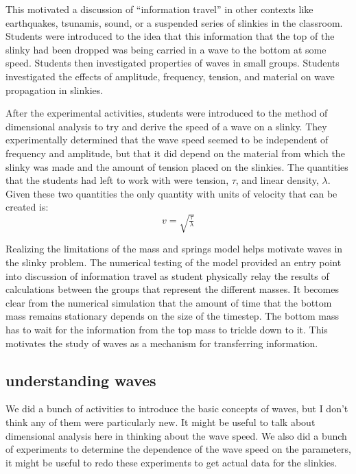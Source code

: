 \documentclass[aps,pre,10pt,superscriptaddress,showpacs,amsmath,amssymb,nofootinbib]{revtex4-1}
\begin{document}
This motivated a discussion of ``information travel'' in other contexts like earthquakes, tsunamis, 
sound, or a suspended series of slinkies in the classroom. Students were introduced to the idea that
this information that the top of the slinky had been dropped was being carried in a wave to the bottom
at some speed. Students then investigated properties of waves in small groups. Students investigated the
effects of amplitude, frequency, tension, and material on wave propagation in slinkies.

After the experimental activities, students were introduced to the method of dimensional analysis
to try and derive the speed of a wave on a slinky. They experimentally determined that the wave speed
seemed to be independent of frequency and amplitude, but that it did depend on the material from which
the slinky was made and the amount of tension placed on the slinkies. The quantities that the students
had left to work with were tension, $\tau$, and linear density, $\lambda$. Given these two quantities
the only quantity with units of velocity that can be created is:
\begin{equation}
  \label{eq:wavespeed}
  v=\sqrt{\tfrac{\tau}{\lambda}}
\end{equation}

Realizing the limitations of the  mass and springs model helps motivate waves in
the slinky problem.  The numerical testing of the model provided an entry point
into discussion of information travel as student  physically relay the results
of calculations between the groups that represent the different masses.  It
becomes clear from the numerical simulation that the amount of time that the
bottom mass remains stationary depends on the size of the timestep.  The bottom
mass has to wait for the information from the top mass to trickle down to it. 
This motivates the study of waves as a mechanism for transferring information.

\subsection{understanding waves}
 We did a bunch of activities to introduce the basic concepts of waves, but I
 don't think any of them were particularly new.  It might be useful to talk about
dimensional analysis here in thinking about the wave speed.  We also did
a bunch of experiments to determine the dependence of the wave speed on
the parameters, it might be useful to redo these experiments to get actual data
for the slinkies.
\end{document}
